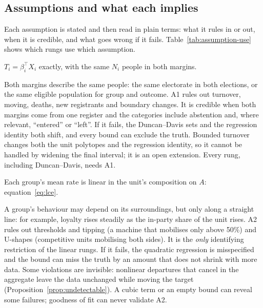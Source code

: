 \subsection{Assumptions and what each implies}\label{sec:assumptions}

Each assumption is stated and then read in plain terms: what it rules in or
out, when it is credible, and what goes wrong if it fails.
Table~\ref{tab:assumption-use} shows which rungs use which assumption.

\begin{assumption}\label{ass:A1}
$T_i=\beta_i^\top X_i$ exactly, with the same $N_i$ people in both margins.
\end{assumption}
\begin{reading}
Both margins describe the same people: the same electorate in both elections,
or the same eligible population for group and outcome. A1 rules out turnover,
moving, deaths, new registrants and boundary changes. It is credible when both
margins come from one register and the categories include abstention and,
where relevant, ``entered'' or ``left''. If it fails, the Duncan--Davis sets and
the regression identity both shift, and every bound can exclude the truth.
Bounded turnover changes both the unit polytopes and the regression identity,
so it cannot be handled by widening the final interval; it is an open
extension. Every rung, including Duncan--Davis, needs A1.
\end{reading}

\begin{assumption}\label{ass:A2}
Each group's mean rate is linear in the unit's composition on $A$:
equation~\eqref{eq:lce}.
\end{assumption}
\begin{reading}
A group's behaviour may depend on its surroundings, but only along a straight
line: for example, loyalty rises steadily as the in-party share of the unit
rises. A2 rules out thresholds and tipping (a machine that mobilises only above
50\%) and U-shapes (competitive units mobilising both sides). It is the
\emph{only} identifying restriction of the linear rungs. If it fails, the
quadratic regression is misspecified and the bound can miss the truth by an
amount that does not shrink with more data. Some violations are invisible:
nonlinear departures that cancel in the aggregate leave the data unchanged while
moving the target (Proposition~\ref{prop:undetectable}). A cubic term or an empty
bound can reveal some failures; goodness of fit can never validate A2.
\end{reading}

